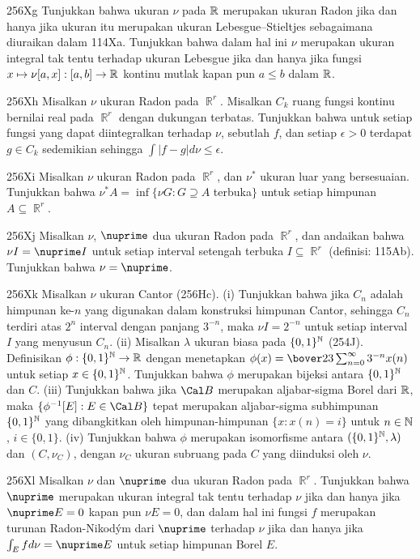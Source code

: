 {\sqheader 256Xg Tunjukkan bahwa ukuran $\nu$ pada $\Bbb R$ merupakan
ukuran Radon jika dan hanya jika ukuran itu merupakan ukuran Lebesgue--Stieltjes
sebagaimana diuraikan dalam 114Xa. Tunjukkan bahwa dalam hal ini $\nu$
merupakan ukuran integral tak tentu terhadap ukuran Lebesgue jika dan hanya jika
fungsi $x\mapsto\nu[a,x]:[a,b]\to\Bbb R$
kontinu mutlak kapan pun $a\le b$ dalam $\Bbb R$.

\spheader 256Xh Misalkan $\nu$ ukuran Radon pada $\BbbR^r$. Misalkan
$C_k$ ruang fungsi kontinu bernilai real pada
$\BbbR^r$ dengan dukungan terbatas. Tunjukkan bahwa untuk setiap
fungsi yang dapat diintegralkan terhadap $\nu$, sebutlah $f$, dan setiap $\epsilon>0$
terdapat $g\in C_k$ sedemikian sehingga $\int|f-g|d\nu\le\epsilon$.

\spheader 256Xi Misalkan $\nu$ ukuran Radon pada $\BbbR^r$, dan $\nu^*$
ukuran luar yang bersesuaian. Tunjukkan bahwa
$\nu^*A=\inf\{\nu G:G\supseteq A$ terbuka$\}$ untuk setiap himpunan
$A\subseteq\BbbR^r$.

\spheader 256Xj Misalkan $\nu$, $\nuprime$ dua ukuran Radon pada
$\BbbR^r$, dan
andaikan bahwa $\nu I=\nuprime I$ untuk setiap interval setengah terbuka
$I\subseteq\BbbR^r$ (definisi: 115Ab). Tunjukkan bahwa $\nu=\nuprime$.

\spheader 256Xk Misalkan $\nu$ ukuran Cantor (256Hc).
(i) Tunjukkan bahwa jika $C_n$ adalah himpunan ke-$n$ yang digunakan dalam
konstruksi himpunan Cantor, sehingga $C_n$ terdiri atas $2^n$ interval dengan
panjang $3^{-n}$, maka $\nu I=2^{-n}$ untuk setiap interval $I$ yang menyusun
$C_n$. (ii) Misalkan $\lambda$ ukuran biasa pada $\{0,1\}^{\Bbb N}$
(254J). Definisikan $\phi:\{0,1\}^{\Bbb N}\to \Bbb R$ dengan menetapkan
$\phi(x)=\bover23\sum_{n=0}^{\infty}3^{-n}x(n)$ untuk setiap
$x\in\{0,1\}^{\Bbb N}$. Tunjukkan bahwa $\phi$ merupakan bijeksi antara
$\{0,1\}^{\Bbb N}$ dan $C$. (iii) Tunjukkan bahwa jika $\Cal B$ merupakan
aljabar-sigma Borel dari $\Bbb R$, maka $\{\phi^{-1}[E]:E\in\Cal B\}$
tepat merupakan aljabar-sigma subhimpunan $\{0,1\}^{\Bbb N}$
yang dibangkitkan oleh himpunan-himpunan $\{x:x(n)=i\}$ untuk
$n\in\Bbb N$, $i\in\{0,1\}$. (iv) Tunjukkan bahwa $\phi$ merupakan
isomorfisme antara $(\{0,1\}^{\Bbb N},\lambda)$ dan $(C,\nu_C)$, dengan
$\nu_C$ ukuran subruang pada $C$ yang diinduksi oleh $\nu$.

\spheader 256Xl Misalkan $\nu$ dan $\nuprime$ dua ukuran Radon pada
$\BbbR^r$. Tunjukkan bahwa $\nuprime$ merupakan ukuran integral tak tentu terhadap
$\nu$ jika dan hanya jika $\nuprime E=0$ kapan pun $\nu E=0$, dan dalam hal
ini fungsi $f$ merupakan turunan Radon-Nikod\'ym dari $\nuprime$ terhadap
$\nu$ jika dan hanya jika $\int_Efd\nu=\nuprime E$ untuk setiap himpunan
Borel $E$.

}
